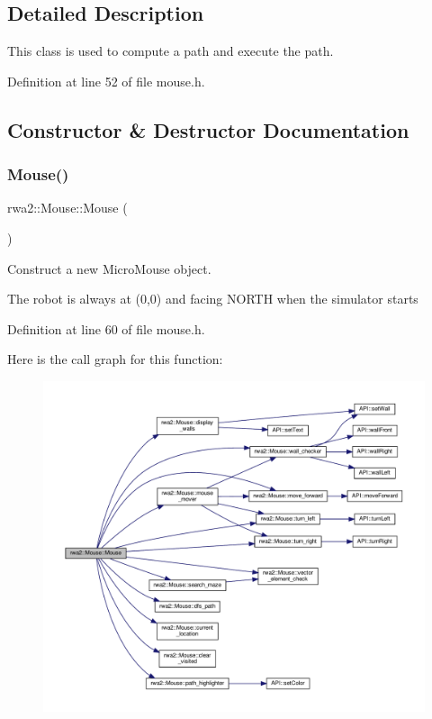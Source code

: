 \subsection{Detailed Description}
This class is used to compute a path and execute the path. 

Definition at line 52 of file mouse.\+h.



\subsection{Constructor \& Destructor Documentation}
\mbox{\label{classrwa2_1_1_mouse_a048dffae3aaa3a6ddc2c6cc4741a097c}} 
\subsubsection{\texorpdfstring{Mouse()}{Mouse()}}
{\footnotesize\ttfamily rwa2\+::\+Mouse\+::\+Mouse (\begin{DoxyParamCaption}{ }\end{DoxyParamCaption})\hspace{0.3cm}{\ttfamily [inline]}}



Construct a new Micro\+Mouse object. 

The robot is always at (0,0) and facing N\+O\+R\+TH when the simulator starts 

Definition at line 60 of file mouse.\+h.

Here is the call graph for this function\+:
\nopagebreak
\begin{figure}[H]
\begin{center}
\leavevmode
\includegraphics[width=350pt]{classrwa2_1_1_mouse_a048dffae3aaa3a6ddc2c6cc4741a097c_cgraph}
\end{center}
\end{figure}



